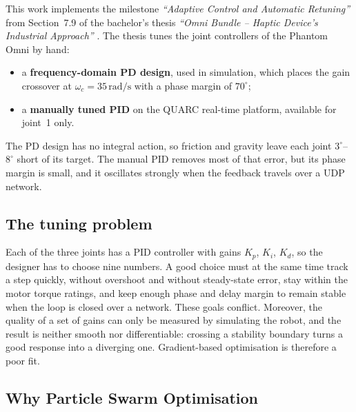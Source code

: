 \documentclass[11pt,a4paper]{article}
\begin{document}
This work implements the milestone \emph{``Adaptive Control and Automatic Retuning''} from Section~7.9 of
the bachelor's thesis \emph{``Omni Bundle -- Haptic Device's Industrial Approach''}
\cite{gavan2026}. The thesis tunes the joint controllers of the Phantom Omni by hand:
\begin{itemize}[nosep]
  \item a \textbf{frequency-domain PD design}, used in simulation, which places the gain crossover at
        $\omega_c = 35\,\mathrm{rad/s}$ with a phase margin of $70^\circ$;
  \item a \textbf{manually tuned PID} on the QUARC real-time platform, available for joint~1 only.
\end{itemize}
The PD design has no integral action, so friction and gravity leave each joint $3^\circ$--$8^\circ$ short of
its target. The manual PID removes most of that error, but its phase margin is small, and it oscillates
strongly when the feedback travels over a UDP network.

\subsection{The tuning problem}

Each of the three joints has a PID controller with gains $K_p$, $K_i$, $K_d$, so the designer has to choose
nine numbers. A good choice must at the same time track a step quickly, without overshoot and without
steady-state error, stay within the motor torque ratings, and keep enough phase and delay margin to remain
stable when the loop is closed over a network. These goals conflict. Moreover, the quality of a set of
gains can only be measured by simulating the robot, and the result is neither smooth nor differentiable:
crossing a stability boundary turns a good response into a diverging one. Gradient-based optimisation is
therefore a poor fit.

\subsection{Why Particle Swarm Optimisation}
\end{document}
